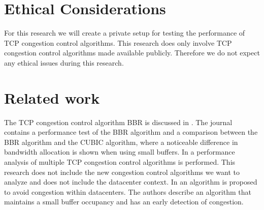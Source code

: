 \documentclass{article}
\begin{document}
\section{Ethical Considerations}
For this research we will create a private setup for testing the performance of TCP congestion control algorithms. This research does only involve TCP congestion control algorithms made available publicly. Therefore we do not expect any ethical issues during this research.

\section{Related work}
The TCP congestion control algorithm BBR is discussed in \cite{bbr-congestion}. The journal contains a performance test of the BBR algorithm and a comparison between the BBR algorithm and the CUBIC algorithm, where a noticeable difference in bandwidth allocation is shown when using small buffers. In \cite{multiple-congestion} a performance analysis of multiple TCP congestion control algorithms is performed. This research does not include the new congestion control algorithms we want to analyze and does not include the datacenter context. In \cite{dctcp-congestion-original} an algorithm is proposed to avoid congestion within datacenters. The authors describe an algorithm that maintains a small buffer occupancy and has an early detection of congestion.

\printbibliography
\end{document}
